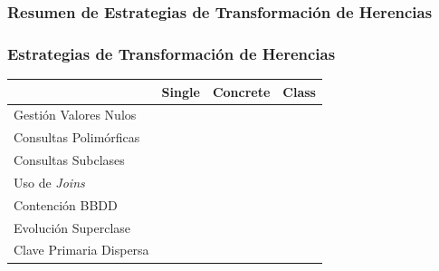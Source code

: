 \documentclass[a4paper,slidestop,xcolor=pst,dvips,blue]{beamer}
\newcommand{\cmark}{\ding{51}}
\newcommand{\xmark}{\ding{55}}
\begin{document}
\subsubsection{Resumen de Estrategias de Transformación de Herencias}

\begin{frame}[c]
    \frametitle{Estrategias de Transformación de Herencias}
    \begin{center}
        \begin{tabular}{||l|c|c|c||}
        \hline \hline
                                & Single         & Concrete        & Class   \\ \hline
        Gestión Valores Nulos   & \xmark         & \cmark          & \cmark  \\ \hline
        Consultas Polimórficas  & \cmark         & \xmark          & \xmark  \\ \hline
        Consultas Subclases     & \xmark         & \cmark          & \cmark  \\ \hline
        Uso de \emph{Joins}     & \cmark         & \cmark          & \xmark  \\ \hline
        Contención BBDD         & \xmark         & \cmark          & \cmark  \\ \hline
        Evolución Superclase    & \cmark         & \xmark          & \cmark  \\ \hline
        Clave Primaria Dispersa & \xmark         & \cmark          & \xmark  \\ \hline
        \hline
        \end{tabular}
    \end{center}
\end{frame}
\end{document}
